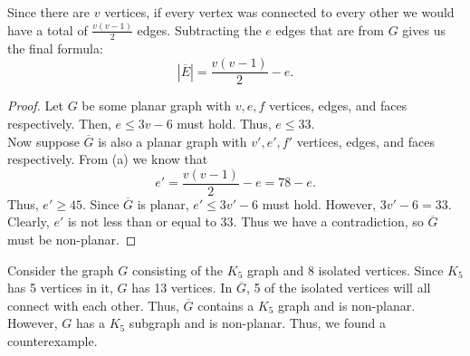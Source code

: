 \documentclass[11pt]{article}
\begin{document}
\begin{solution} \begin{Parts}
\Part Since there are $v$ vertices, if every vertex was connected to every other
we would have a total of $\frac{v(v-1)}{2}$ edges. Subtracting the $e$ edges that are from $G$ gives us the final formula:
$$|\overline{E}| = \frac{v(v-1)}{2}-e.$$

\Part \begin{proof} Let $G$ be some planar graph with $v,e,f$ vertices, edges, and faces respectively.
Then, $e\leq 3v-6$ must hold.
Thus, $e\leq33.$
\\Now suppose $\overline{G}$ is also a planar graph with $v',e',f'$ vertices, edges, and faces respectively.
From (a) we know that 
$$e'=\frac{v(v-1)}{2}-e=78-e.$$
Thus, $e'\geq45.$
Since $\overline{G}$ is planar, $e'\leq3v'-6$ must hold.
However, $3v'-6=33$. Clearly, $e'$ is not less than or equal to 33.
Thus we have a contradiction, so $\overline{G}$ must be non-planar.
\end{proof}

\Part Consider the graph $G$ consisting of the $K_5$ graph and 8 isolated vertices. 
Since $K_5$ has 5 vertices in it, $G$ has 13 vertices.
In $\overline{G}$, 5 of the isolated vertices will all connect with each other. 
Thus, $\overline{G}$ contains a $K_5$ graph and is non-planar. 
However, $G$ has a $K_5$ subgraph and is non-planar.
Thus, we found a counterexample. 
\end{Parts}\end{solution}\newpage
\end{document}
